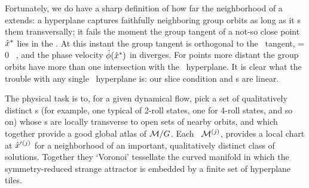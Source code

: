 



Fortunately, we do have a sharp definition of how far the neighborhood
of a {\template} extends:
a hyperplane captures faithfully neighboring group orbits as long
as it \slice s them transversally; it fails the moment the group tangent of
a not-so close point $\hat{x}^\ast$ lies in the \slice.
At this instant the group tangent is orthogonal to the \slice\ tangent,
\beq
\braket{\groupTan(\sspRSing)}{\sliceTan{}}= 0
\, ,
%
and the phase velocity $\dot{{\bf \phi}}(\hat{x}^\ast)$ in 
diverges.  For points more distant the group orbits have more than one
intersection with the \slice\ hyperplane. It is clear what the trouble
with any single \slice\ hyperplane is: our slice condition and \slice s
are linear.

The physical task is to, for a given dynamical flow, pick a set of
qualitatively distinct {\template s} (for example, one typical of 2-roll
states, one for 4-roll states, and so on) whose \slice s  are locally
transverse to open sets of nearby orbits, and which together provide a
good global atlas of ${\cal M}/G$. Each \slice\ ${\cal M}{}^{(j)}$, provides a
local chart at ${\hat{x}'}{}^{(j)}$ for a neighborhood of an important,
qualitatively distinct class of solutions. Together they `Voronoi'
tessellate  the curved manifold in which the symmetry-reduced strange
attractor is embedded by a finite set of hyperplane tiles.

